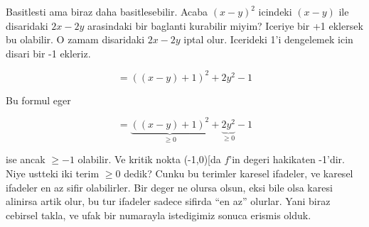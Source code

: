 \documentclass[12pt,fleqn]{article}
\begin{document}
Basitlesti ama biraz daha basitlesebilir. Acaba $(x-y)^2$ icindeki $(x-y)$
ile disaridaki $2x - 2y$ arasindaki bir baglanti kurabilir miyim? Iceriye
bir +1 eklersek bu olabilir. O zamam disaridaki $2x - 2y$ iptal
olur. Icerideki 1'i dengelemek icin disari bir -1 ekleriz. 

\[  = ((x-y) + 1)^2 + 2y^2 - 1\]

Bu formul eger 

\[  = \underbrace{((x-y) + 1)^2}_{\ge 0} + \underbrace{2y^2}_{\ge 0} - 1\]

ise ancak $\ge -1$ olabilir. Ve kritik nokta (-1,0)[da $f$'in degeri
hakikaten -1'dir. Niye ustteki iki terim $\ge 0$ dedik? Cunku bu terimler
karesel ifadeler, ve karesel ifadeler en az sifir olabilirler. Bir deger ne
olursa olsun, eksi bile olsa karesi alinirsa artik olur, bu tur ifadeler
sadece sifirda ``en az'' olurlar. Yani biraz cebirsel takla, ve ufak bir
numarayla istedigimiz sonuca erismis olduk.
\end{document}
